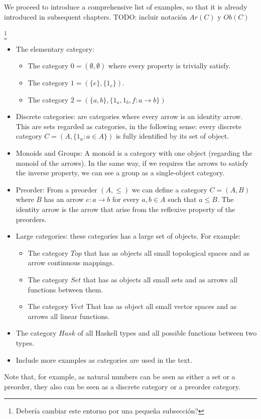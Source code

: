 We proceed to introduce a comprehensive list of examples, so that it is already introduced in subsequent chapters. {\color{red} TODO: incluir notación $Ar(C)$ y $Ob(C)$}
\begin{example} \footnote{Debería cambiar este entorno por una pequeña subsección?} 

  \begin{itemize}  
\item The elementary category:
  \begin{itemize}
  \item The category $0 = ( \emptyset, \emptyset)$ where every property is trivially satisfy.
  \item The category $1 = (\{e\},\{1_e\})$.
  \item The category $2 = (\{a,b\},\{1_a,1_b,f:a\to b\})$
  \end{itemize}

\item Discrete categories: are categories where every arrow is an identity arrow. This are sets regarded as categories, in the following sense: every discrete category $C=(A, \{1_a : a \in A\})$ is fully identified by its set of object.  
\item Monoids and Groups: A monoid is a category with one object (regarding the monoid of the arrows). In the same way, if we requires the arrows to satisfy the inverse property, we can see a group as a single-object category. 
\item Preorder: From a preorder $(A, \le)$ we can define a category $C = (A, B)$ where $B$ has an arrow $e: a \to b$ for every $a,b\in A$ such that $a \le B$. The identity arrow is the arrow that arise from the reflexive property of the preorders. 

\item Large categories: these categories has a large set of objects. For example:
  \begin{itemize}
\item The category $Top$ that has as objects all small topological spaces and as arrow continuous mappings.
\item The category $Set$ that has as objects all small sets and as arrows all functions between them.
\item The category $Vect$ That has as object all small vector spaces and as arrows all linear functions.
\end{itemize}

\item The category $Hask$ of all Haskell types and all possible functions between two types.
\item Include more examples as categories are used in the text.
\end{itemize}
Note that, for example, as natural numbers can be seen as either a set or a preorder, they also can be seen as a discrete category or a preorder category.
\end{example}






